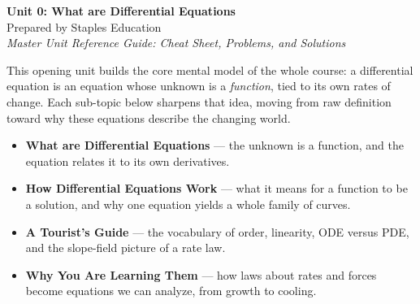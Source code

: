 




\begin{center}
    {\LARGE \bfseries Unit 0: What are Differential Equations}\\[6pt]
    {\large Prepared by Staples Education}\\[4pt]
    {\itshape Master Unit Reference Guide: Cheat Sheet, Problems, and Solutions}
\end{center}

\vspace{0.4em}

\tableofcontents

\vspace{0.4em}

\begin{topicsbox}
This opening unit builds the core mental model of the whole course: a
differential equation is an equation whose unknown is a \emph{function}, tied
to its own rates of change. Each sub-topic below sharpens that idea, moving
from raw definition toward why these equations describe the changing world.
\begin{itemize}[leftmargin=1.4em, itemsep=3pt]
    \item \textbf{What are Differential Equations} --- the unknown is a
          function, and the equation relates it to its own derivatives.
    \item \textbf{How Differential Equations Work} --- what it means for a
          function to be a solution, and why one equation yields a whole
          family of curves.
    \item \textbf{A Tourist's Guide} --- the vocabulary of order, linearity,
          ODE versus PDE, and the slope-field picture of a rate law.
    \item \textbf{Why You Are Learning Them} --- how laws about rates and
          forces become equations we can analyze, from growth to cooling.
\end{itemize}
\end{topicsbox}

